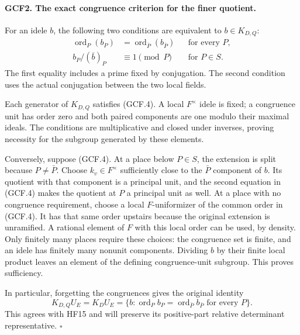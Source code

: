 \paragraph{GCF2. The exact congruence criterion for the finer quotient.}
\label{claim:GCF2}
For an idele \(b\), the following two conditions are equivalent to
\(b\in K_{D,Q}\):
\[
 \begin{aligned}
  \operatorname{ord}_P(b_P)&=
                 \operatorname{ord}_{\bar P}(b_{\bar P})
                        &&\text{for every }P,\\
  b_P/(\bar b)_P&\equiv1\pmod P &&\text{for }P\in S.
 \end{aligned}                                                   \tag{GCF.4}
\]
The first equality includes a prime fixed by conjugation.  The second
condition uses the actual conjugation between the two local fields.

Each generator of \(K_{D,Q}\) satisfies (GCF.4).  A local
\(F^{\times}\) idele is fixed; a congruence unit has order zero
and both paired components are one modulo their maximal ideals.
The conditions are multiplicative and closed under inverses, proving
necessity for the subgroup generated by these elements.

Conversely, suppose (GCF.4).  At a place below \(P\in S\), the
extension is split because \(P\ne\bar P\).  Choose
\(k_v\in F^{\times}\) sufficiently close to the \(\bar P\)
component of \(b\).  Its quotient with that component is a principal
unit, and the second equation in (GCF.4) makes the quotient at \(P\)
a principal unit as well.  At a place with no congruence requirement,
choose a local \(F\)-uniformizer of the common order in (GCF.4).
It has that same order upstairs because the original extension is
unramified.  A rational element of \(F\) with this local order can
be used, by density.  Only finitely many places require these choices:
the congruence set is finite, and an idele has finitely many nonunit
components.  Dividing \(b\) by their finite local product leaves an
element of the defining congruence-unit subgroup.  This proves
sufficiency.

In particular, forgetting the congruences gives the original identity
\[
 K_{D,Q}U_E=K_DU_E
 =\{b:\operatorname{ord}_P b_P
                  =\operatorname{ord}_{\bar P}b_{\bar P}
                    \text{ for every }P\}.             \tag{GCF.5}
\]
This agrees with HF15 and will preserve its positive-part relative
determinant representative.
\hfill\(\square\)

